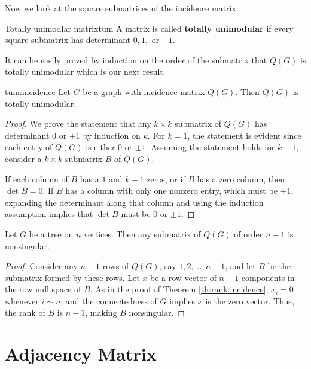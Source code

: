 \documentclass[../basic_graph_theory.tex]{subfiles}
\begin{document}
Now we look at the square submatrices of the incidence matrix.

\begin{Def}{Totally unimodlar matrix}{tum}
  A matrix is called \textbf{totally unimodular} if every square submatrix has determinant \(0, 1,\) or \(-1\).
\end{Def}

It can be easily proved by induction on the order of the submatrix that \(Q(G)\) is totally unimodular which is our next result.

\begin{Thm}{}{tum:incidence}
  Let \(G\) be a graph with incidence matrix \(Q(G)\). Then \(Q(G)\) is totally unimodular.
\end{Thm}
\begin{proof}
  We prove the statement that any \(k \times k\) submatrix of \(Q(G)\) has determinant \(0\) or \(\pm 1\) by induction on \(k\). For \(k = 1\), the statement is evident since each entry of \(Q(G)\) is either \(0\) or \(\pm 1\). Assuming the statement holds for \(k - 1\), consider a \(k \times k\) submatrix \(B\) of \(Q(G)\).

  If each column of \(B\) has a \(1\) and \(k - 1\) zeros, or if \(B\) has a zero column, then \( \det B = 0\). If \(B\) has a column with only one nonzero entry, which must be \(\pm 1\), expanding the determinant along that column and using the induction assumption implies that \(\det B\) must be \(0\) or \(\pm 1\).
\end{proof}

\begin{Thm}{}{}
  Let \(G\) be a tree on \(n\) vertices. Then any submatrix of \(Q(G)\) of order \(n - 1\) is nonsingular.
\end{Thm}
\begin{proof}
  Consider any \(n - 1\) rows of \(Q(G)\), say \(1, 2, \dots, n - 1\), and let \(B\) be the submatrix formed by these rows. Let \(x\) be a row vector of \(n - 1\) components in the row null space of \(B\). As in the proof of Theorem \ref{th:rank:incidence}, \(x_i = 0\) whenever \(i \sim n\), and the connectedness of \(G\) implies \(x\) is the zero vector. Thus, the rank of \(B\) is \(n - 1\), making \(B\) nonsingular.
\end{proof}

\section{Adjacency Matrix}
\end{document}
